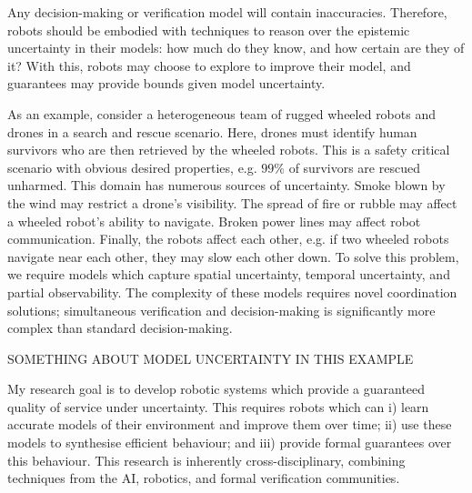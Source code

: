 \documentclass[11pt]{article}
\begin{document}

Any decision-making or verification model will contain inaccuracies.
%
Therefore, robots should be embodied with techniques to reason over the epistemic uncertainty in their models: how much do they know, and how certain are they of it?
%
With this, robots may choose to explore to improve their model, and guarantees may provide bounds given model uncertainty.

\fi


As an example, consider a heterogeneous team of rugged wheeled robots and drones in a search and rescue scenario.
%
Here, drones must identify human survivors who are then retrieved by the wheeled robots.
%
This is a safety critical scenario with obvious desired properties, e.g. $99\%$ of survivors are rescued unharmed.
%
This domain has numerous sources of uncertainty.
%
Smoke blown by the wind may restrict a drone's visibility.
%
The spread of fire or rubble may affect a wheeled robot's ability to navigate.
%
Broken power lines may affect robot communication.
%
Finally, the robots affect each other, e.g. if two wheeled robots navigate near each other, they may slow each other down.
%
To solve this problem, we require models which capture spatial uncertainty, temporal uncertainty, and partial observability.
%
The complexity of these models requires novel coordination solutions; simultaneous verification and decision-making is significantly more complex than standard decision-making.

SOMETHING ABOUT MODEL UNCERTAINTY IN THIS EXAMPLE


My research goal is to develop robotic systems which provide a guaranteed quality of service under uncertainty.
%
This requires robots which can i) learn accurate models of their environment and improve them over time; ii) use these models to synthesise efficient behaviour; and iii) provide formal guarantees over this behaviour.
%
This research is inherently cross-disciplinary, combining techniques from the AI, robotics, and formal verification communities.
%
\end{document}
